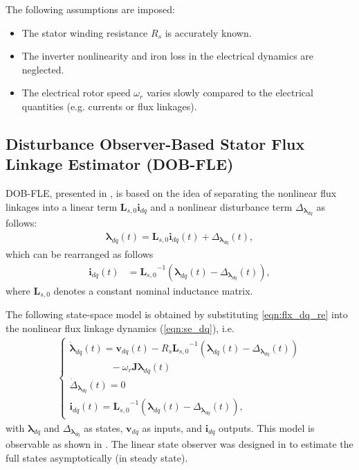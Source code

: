 \documentclass[conference]{IEEEtran}
\begin{document}
The following assumptions are imposed:
    \begin{itemize}
    \item The stator winding resistance $R_s$ is accurately known.
    \item The inverter nonlinearity and iron loss in the electrical dynamics are neglected.
    \item The electrical rotor speed $\omega_r$ varies slowly compared to the electrical quantities (e.g. currents or flux linkages).
    \end{itemize}
    
\subsection{Disturbance Observer-Based Stator Flux Linkage Estimator (DOB-FLE)} 

DOB-FLE, presented in \cite{b11}, is based on the idea of separating the nonlinear flux linkages into a linear term ${\boldsymbol{L}_{s,0}}{\boldsymbol{i}}_{dq}$ and a nonlinear disturbance term $\Delta_{\boldsymbol{\lambda}_{dq}}$ as follows:     \begin{align}\label{eqn:flx_dq}
    {\boldsymbol{\lambda}_{dq}}(t) = {\boldsymbol{L}_{s,0}}{\boldsymbol{i}}_{dq}(t) + \Delta_{\boldsymbol{\lambda}_{dq}}(t),
    \end{align}
which can be rearranged as follows 
    \begin{align}\label{eqn:flx_dq_re}
    {\boldsymbol{i}}_{dq}(t)&={\boldsymbol{L}_{s,0}}^{-1}\left( {\boldsymbol{\lambda}_{dq}}(t) -\Delta_{\boldsymbol{\lambda}_{dq}}(t)\right), 
    \end{align}    
where ${\boldsymbol{L}_{s,0}}$ denotes a constant nominal inductance matrix. 

The following state-space model is obtained by substituting \eqref{eqn:flx_dq_re} into the nonlinear flux linkage dynamics (\ref{eqn:se_dq}), i.e.   
\begin{align}\label{eqn:sota_eq}
    \begin{cases}
    {\dot{\boldsymbol{{{\lambda}}} }_{dq}(t)} = {{\boldsymbol{v}}_{dq}(t)} - {{{R}}_{s}} {\boldsymbol{L}_{s,0}}^{-1}\left( {\boldsymbol{\lambda}_{dq}}(t) - \Delta_{\boldsymbol{\lambda}_{dq}}(t)\right) \\ 
    \quad\quad\quad\quad\ - \omega_{r}\boldsymbol{J} { {\boldsymbol{{\lambda}} }_{dq}(t)} \\
    \dot \Delta_{\boldsymbol{\lambda}_{dq}}(t) = 0 \\
   {\boldsymbol{i}}_{dq}(t) = {\boldsymbol{L}_{s,0}}^{-1}\left( {\boldsymbol{\lambda}_{dq}}(t) -\Delta_{\boldsymbol{\lambda}_{dq}}(t)\right), 
    \end{cases}
    \end{align}
with $\boldsymbol{{{\lambda}}}_{dq}$ and $\Delta_{\boldsymbol{\lambda}_{dq}}$ as states, ${{\boldsymbol{v}}_{dq}}$ as inputs, and ${\boldsymbol{i}}_{dq}$ outputs. This model is observable as shown in \cite{b11}. The linear state observer was designed in \cite{b11} to estimate the full states asymptotically (in steady state). 
\end{document}
